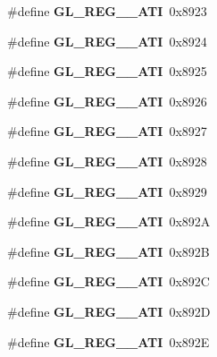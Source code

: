 \begin{DoxyCompactItemize}
\item 
\#define {\bfseries G\+L\+\_\+\+R\+E\+G\+\_\+\_\+\+A\+T\+I}~0x8923\label{_s_d_l__opengl_8h_a4d633cde66076eccf978eaf674f75e62}

\item 
\#define {\bfseries G\+L\+\_\+\+R\+E\+G\+\_\+\_\+\+A\+T\+I}~0x8924\label{_s_d_l__opengl_8h_a69a573463c4582e0a75034286bad7488}

\item 
\#define {\bfseries G\+L\+\_\+\+R\+E\+G\+\_\+\_\+\+A\+T\+I}~0x8925\label{_s_d_l__opengl_8h_a86af736bf8d31f047eaaa8defff60739}

\item 
\#define {\bfseries G\+L\+\_\+\+R\+E\+G\+\_\+\_\+\+A\+T\+I}~0x8926\label{_s_d_l__opengl_8h_a6b6304c5d934789c20aec6a9a9c0c46e}

\item 
\#define {\bfseries G\+L\+\_\+\+R\+E\+G\+\_\+\_\+\+A\+T\+I}~0x8927\label{_s_d_l__opengl_8h_a9ef01ad070d06c76c600b78b0dc62c5a}

\item 
\#define {\bfseries G\+L\+\_\+\+R\+E\+G\+\_\+\_\+\+A\+T\+I}~0x8928\label{_s_d_l__opengl_8h_a285d1d5a5cc3a717a7c75d748ed52ae1}

\item 
\#define {\bfseries G\+L\+\_\+\+R\+E\+G\+\_\+\_\+\+A\+T\+I}~0x8929\label{_s_d_l__opengl_8h_a88d3aecf09313e2212c025c7e85df98a}

\item 
\#define {\bfseries G\+L\+\_\+\+R\+E\+G\+\_\+\_\+\+A\+T\+I}~0x892\+A\label{_s_d_l__opengl_8h_a8bd7523fe809796d3b13597898c376fc}

\item 
\#define {\bfseries G\+L\+\_\+\+R\+E\+G\+\_\+\_\+\+A\+T\+I}~0x892\+B\label{_s_d_l__opengl_8h_a2cc369b1560beac245aa6904a888c14d}

\item 
\#define {\bfseries G\+L\+\_\+\+R\+E\+G\+\_\+\_\+\+A\+T\+I}~0x892\+C\label{_s_d_l__opengl_8h_aad3d78d3bbeb27b36eae386ddd0d52ee}

\item 
\#define {\bfseries G\+L\+\_\+\+R\+E\+G\+\_\+\_\+\+A\+T\+I}~0x892\+D\label{_s_d_l__opengl_8h_a01612ea7eb8cb747587c13397b9b6f3c}

\item 
\#define {\bfseries G\+L\+\_\+\+R\+E\+G\+\_\+\_\+\+A\+T\+I}~0x892\+E\label{_s_d_l__opengl_8h_ae35fa5a4094f1c82dce6fc352033a436}


\end{DoxyCompactItemize}
